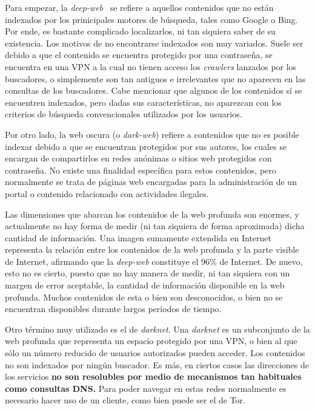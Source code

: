 Para empezar, la \textit{deep-web}~\cite{article:deepweb} se refiere a aquellos contenidos que no están indexados por los prinicipales motores de búsqueda, tales como Google o Bing. Por ende, es bastante complicado localizarlos, ni tan siquiera saber de su existencia.
Los motivos de no encontrarse indexados son muy variados. Suele ser debido a que el contenido se encuentra protegido por una contraseña, se encuentra en una VPN a la cual no tienen acceso los \textit{crawlers} lanzados por los buscadores, o simplemente son tan antiguos e irrelevantes que no aparecen en las consultas de los buscadores.
Cabe mencionar que algunos de los contenidos sí se encuentren indexados, pero dadas sus características, no aparezcan con los criterios de búsqueda convencionales utilizados por los usuarios.

Por otro lado, la web oscura (o \textit{dark-web}) refiere a contenidos que no es posible indexar debido a que se encuentran protegidos por sus autores, los cuales se encargan de compartirlos en redes anónimas o sitios web protegidos con contraseña. 
No existe una finalidad específica para estos contenidos, pero normalmente se trata de páginas web encargadas para la administración de un portal o contenido relacionado con actividades ilegales.

Las dimensiones que abarcan los contenidos de la web profunda son enormes, y actualmente no hay forma de medir (ni tan siquiera de forma aproximada)	dicha cantidad de información.
Una imagen sumamente extendida en Internet representa la relación entre los contenidos de la web profunda y la parte visible de Internet, afirmando que la \textit{deep-web} constituye el 96\% de Internet. De nuevo, esto no es cierto, puesto que no hay manera de medir, ni tan siquiera con un margen de error aceptable, la cantidad de información disponible en la web profunda. Muchos contenidos de esta o bien son desconocidos, o bien no se encuentran disponibles durante largos períodos de tiempo.

Otro término muy utilizado es el de \textit{darknet}. Una \textit{darknet }es un subconjunto de la web profunda que representa un espacio protegido por una VPN, o bien al que sólo un número reducido de usuarios autorizados pueden acceder. Los contenidos no son indexados por ningún buscador. Es más, en ciertos casos las direcciones de los servicios \textbf{no son resolubles por medio de mecanismos tan habituales como consultas DNS.} Para poder navegar en estas redes normalmente es necesario hacer uso de un cliente, como bien puede ser el de Tor.

